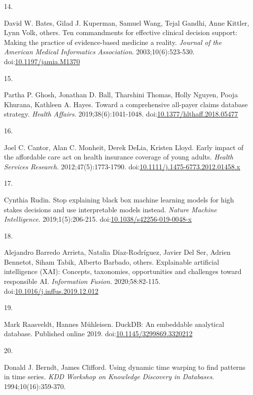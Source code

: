\documentclass[
  12pt,
]{book}
\newlength{\cslhangindent}
\newlength{\csllabelwidth}
\newenvironment{CSLReferences}[2] %
 {\begin{list}{}{%
  \setlength{\itemindent}{0pt}
  \setlength{\leftmargin}{0pt}
  \setlength{\parsep}{0pt}
  \ifodd #1
   \setlength{\leftmargin}{\cslhangindent}
   \setlength{\itemindent}{-1\cslhangindent}
  \fi
  \setlength{\itemsep}{#2\baselineskip}}}
 {\end{list}}
\newcommand{\CSLLeftMargin}[1]{\parbox[t]{\csllabelwidth}{\strut#1\strut}}
\newcommand{\CSLRightInline}[1]{\parbox[t]{\linewidth - \csllabelwidth}{\strut#1\strut}}
\begin{document}
\begin{CSLReferences}{0}{1}
\CSLLeftMargin{14. }%
\CSLRightInline{David W. Bates, Gilad J. Kuperman, Samuel Wang, Tejal
Gandhi, Anne Kittler, Lynn Volk, others. Ten commandments for effective
clinical decision support: Making the practice of evidence-based
medicine a reality. \emph{Journal of the American Medical Informatics
Association}. 2003;10(6):523-530.
doi:\href{https://doi.org/10.1197/jamia.M1370}{10.1197/jamia.M1370}}

\CSLLeftMargin{15. }%
\CSLRightInline{Partha P. Ghosh, Jonathan D. Ball, Tharshini Thomas,
Holly Nguyen, Pooja Khurana, Kathleen A. Hayes. Toward a comprehensive
all-payer claims database strategy. \emph{Health Affairs}.
2019;38(6):1041-1048.
doi:\href{https://doi.org/10.1377/hlthaff.2018.05477}{10.1377/hlthaff.2018.05477}}

\CSLLeftMargin{16. }%
\CSLRightInline{Joel C. Cantor, Alan C. Monheit, Derek DeLia, Kristen
Lloyd. Early impact of the affordable care act on health insurance
coverage of young adults. \emph{Health Services Research}.
2012;47(5):1773-1790.
doi:\href{https://doi.org/10.1111/j.1475-6773.2012.01458.x}{10.1111/j.1475-6773.2012.01458.x}}

\CSLLeftMargin{17. }%
\CSLRightInline{Cynthia Rudin. Stop explaining black box machine
learning models for high stakes decisions and use interpretable models
instead. \emph{Nature Machine Intelligence}. 2019;1(5):206-215.
doi:\href{https://doi.org/10.1038/s42256-019-0048-x}{10.1038/s42256-019-0048-x}}

\CSLLeftMargin{18. }%
\CSLRightInline{Alejandro Barredo Arrieta, Natalia Díaz-Rodríguez,
Javier Del Ser, Adrien Bennetot, Siham Tabik, Alberto Barbado, others.
Explainable artificial intelligence ({XAI}): Concepts, taxonomies,
opportunities and challenges toward responsible {AI}. \emph{Information
Fusion}. 2020;58:82-115.
doi:\href{https://doi.org/10.1016/j.inffus.2019.12.012}{10.1016/j.inffus.2019.12.012}}

\CSLLeftMargin{19. }%
\CSLRightInline{Mark Raasveldt, Hannes Mühleisen. {DuckDB}: An
embeddable analytical database. Published online 2019.
doi:\href{https://doi.org/10.1145/3299869.3320212}{10.1145/3299869.3320212}}

\CSLLeftMargin{20. }%
\CSLRightInline{Donald J. Berndt, James Clifford. Using dynamic time
warping to find patterns in time series. \emph{KDD Workshop on Knowledge
Discovery in Databases}. 1994;10(16):359-370.}


\end{CSLReferences}
\end{document}
